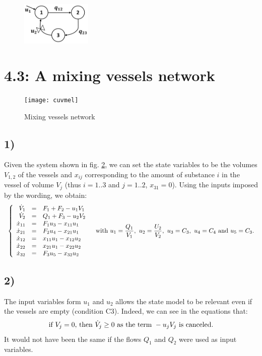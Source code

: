 \begin{figure}[h!]
  \centering
  \includegraphics[width=0.3\textwidth]{graph2}
  \caption{}
  \label{graph2}
\end{figure}


\section*{4.3: A mixing vessels network}
\begin{figure}[h!]
  \centering
  \texttt{[image: cuvmel]}
  \caption{Mixing vessels network}
  \label{cuvmel}
\end{figure}
\subsection*{1)}
Given the system shown in fig. \ref{cuvmel}, we can set the state variables to be the volumes $V_{1,2}$ of the vessels and $x_{ij}$ corresponding to the amount of substance $i$ in the vessel of volume $V_j$ (thus $i=1..3$ and $j=1..2$, $x_{31}=0$). Using the inputs imposed by the wording, we obtain:
\begin{equation}
\begin{array}{l l}
\left\{
  \begin{array}{r c l}
  \dot{V}_1&=&F_1+F_2-u_1V_1\\
  \dot{V}_2&=&Q_1+F_3-u_2V_2\\
  \dot{x}_{11}&=&F_1u_3- x_{11}u_1\\
  \dot{x}_{21}&=&F_2u_4-x_{21}u_1 \\ 
  \dot{x}_{12}&=&x_{11}u_1-x_{12}u_2\\
  \dot{x}_{22}&=&x_{21}u_1-x_{22}u_2 \\
  \dot{x}_{32}&=&F_3u_5-x_{32}u_2 \\
  \end{array} \right.
  & \textnormal{with } u_1=\dfrac{Q_1}{V_1},~u_2=\dfrac{U_2}{V_2},~u_3=C_3,~u_4=C_4\textnormal{ and }u_5=C_3.\\
  \end{array}
\label{eq:statemodel3}
\end{equation}

\subsection*{2)}
The input variables form $u_1$ and $u_2$ allows the state model to be relevant even if the vessels are empty (condition C3). Indeed, we can see in the equations that:
\[
\textnormal{if }V_j=0\textnormal{, then }\dot{V}_j\geq 0 \textnormal{ as the term } -u_jV_j \textnormal{ is canceled.}
\]
It would not have been the same if the flows $Q_1$ and $Q_2$ were used as input variables.

